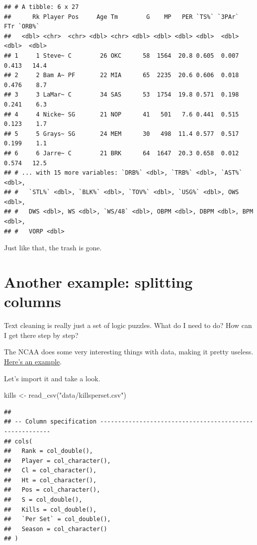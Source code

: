 \documentclass[
]{book}
\newenvironment{Shaded}{\begin{snugshade}}{\end{snugshade}}
\newcommand{\FunctionTok}[1]{\textcolor[rgb]{0.00,0.00,0.00}{#1}}
\newcommand{\NormalTok}[1]{#1}
\newcommand{\OtherTok}[1]{\textcolor[rgb]{0.56,0.35,0.01}{#1}}
\newcommand{\StringTok}[1]{\textcolor[rgb]{0.31,0.60,0.02}{#1}}
\begin{document}
\begin{verbatim}
## # A tibble: 6 x 27
##      Rk Player Pos     Age Tm        G    MP   PER `TS%` `3PAr`   FTr `ORB%`
##   <dbl> <chr>  <chr> <dbl> <chr> <dbl> <dbl> <dbl> <dbl>  <dbl> <dbl>  <dbl>
## 1     1 Steve~ C        26 OKC      58  1564  20.8 0.605  0.007 0.413   14.4
## 2     2 Bam A~ PF       22 MIA      65  2235  20.6 0.606  0.018 0.476    8.7
## 3     3 LaMar~ C        34 SAS      53  1754  19.8 0.571  0.198 0.241    6.3
## 4     4 Nicke~ SG       21 NOP      41   501   7.6 0.441  0.515 0.123    1.7
## 5     5 Grays~ SG       24 MEM      30   498  11.4 0.577  0.517 0.199    1.1
## 6     6 Jarre~ C        21 BRK      64  1647  20.3 0.658  0.012 0.574   12.5
## # ... with 15 more variables: `DRB%` <dbl>, `TRB%` <dbl>, `AST%` <dbl>,
## #   `STL%` <dbl>, `BLK%` <dbl>, `TOV%` <dbl>, `USG%` <dbl>, OWS <dbl>,
## #   DWS <dbl>, WS <dbl>, `WS/48` <dbl>, OBPM <dbl>, DBPM <dbl>, BPM <dbl>,
## #   VORP <dbl>
\end{verbatim}

Just like that, the trash is gone.

\hypertarget{another-example-splitting-columns}{%
\section{Another example: splitting columns}\label{another-example-splitting-columns}}

Text cleaning is really just a set of logic puzzles. What do I need to do? How can I get there step by step?

The NCAA does some very interesting things with data, making it pretty useless. \href{https://unl.box.com/s/kxjh8k7bm95i8eeovao18nqiky860j1s}{Here's an example}.

Let's import it and take a look.

\begin{Shaded}
\begin{Highlighting}[]
\NormalTok{kills }\OtherTok{\textless{}{-}} \FunctionTok{read\_csv}\NormalTok{(}\StringTok{"data/killsperset.csv"}\NormalTok{)}
\end{Highlighting}
\end{Shaded}

\begin{verbatim}
## 
## -- Column specification --------------------------------------------------------
## cols(
##   Rank = col_double(),
##   Player = col_character(),
##   Cl = col_character(),
##   Ht = col_character(),
##   Pos = col_character(),
##   S = col_double(),
##   Kills = col_double(),
##   `Per Set` = col_double(),
##   Season = col_character()
## )
\end{verbatim}
\end{document}

